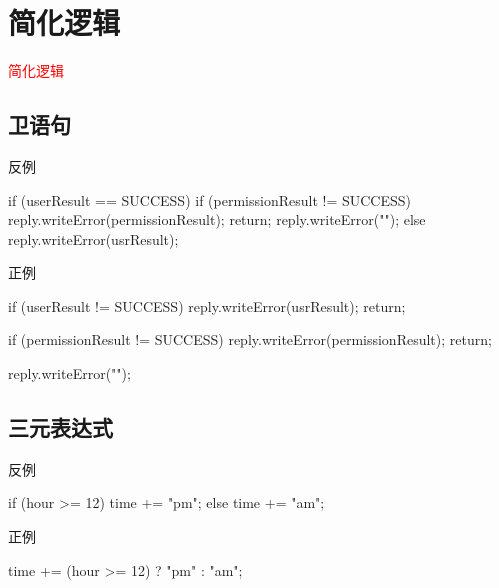 \section{简化逻辑}
\label{sec:simple-logic}

\begin{frame}
  \begin{center}
    \Huge{\textcolor{red}{简化逻辑}}
  \end{center}
\end{frame}

\subsection{卫语句}

\begin{frame}[fragile]{反例}
  \begin{java}
if (userResult == SUCCESS) {
  if (permissionResult != SUCCESS) {
    reply.writeError(permissionResult);
    return;
  }
  reply.writeError("");
} else {
  reply.writeError(usrResult);
}
  \end{java}
\end{frame}

\begin{frame}[fragile]{正例}
  \begin{java}
if (userResult != SUCCESS) {
  reply.writeError(usrResult);
  return;
}

if (permissionResult != SUCCESS) {
  reply.writeError(permissionResult);
  return;
}

reply.writeError("");
  \end{java}
\end{frame}

\subsection{三元表达式}

\begin{frame}[fragile]{反例}
  \begin{java}
if (hour >= 12)  {
  time += "pm";
} else {
  time += "am";
}
  \end{java}
\end{frame}

\begin{frame}[fragile]{正例}
  \begin{java}
time += (hour >= 12) ? "pm" : "am";
  \end{java}
\end{frame}

